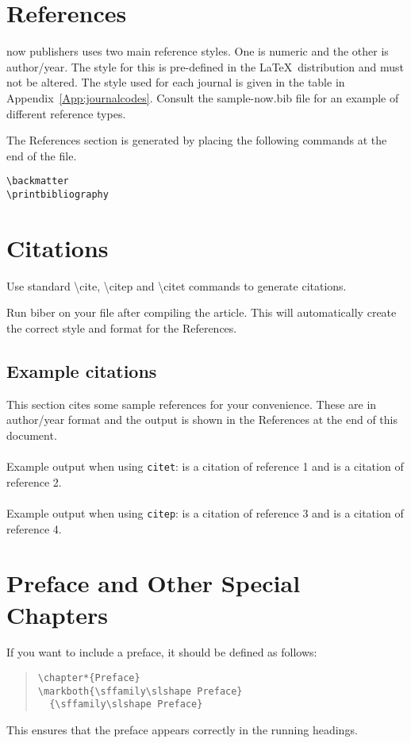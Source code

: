 \documentclass[examplefnt,biber]{nowfnt} %
\begin{document}
\section{References}
now publishers uses two main reference styles. One is numeric and the other is author/year.
The style for this is pre-defined in the  \LaTeX\ distribution and must not be altered. The style used for
each journal is given in the table in Appendix~\ref{App:journalcodes}.
Consult the sample-now.bib file for an example of different reference types. 

The References section is generated by placing the following commands at the 
end of the file.
\begin{verbatim}
\backmatter 
\printbibliography
\end{verbatim}

\section{Citations}
Use standard \textbackslash cite, \textbackslash citep and \textbackslash citet commands to generate
citations.

Run biber on your file after compiling the article. This will automatically create
the correct style and format for the References.

\subsection{Example citations}
This section cites some sample references for your convenience. These are in author/year format and
the output is shown in the References at the end of this document.\\
\\
\noindent Example output when using \texttt{citet}: 
\citet{arvolumenumber} is a citation of reference 1 and
\citet{ber1995} is a citation of reference 2. \\
\\
\noindent Example output when using \texttt{citep}: 
\citep{beditorvolumenumber} is a citation of reference 3 and
\citep{inproceedings} is a citation of reference 4.


\section{Preface and Other Special Chapters}

If you want to include a preface, it should be defined as follows:
\begin{quote}
\begin{verbatim}
\chapter*{Preface}
\markboth{\sffamily\slshape Preface}
  {\sffamily\slshape Preface}
\end{verbatim}
\end{quote}
This ensures that the preface appears correctly in the running headings.
\end{document}
